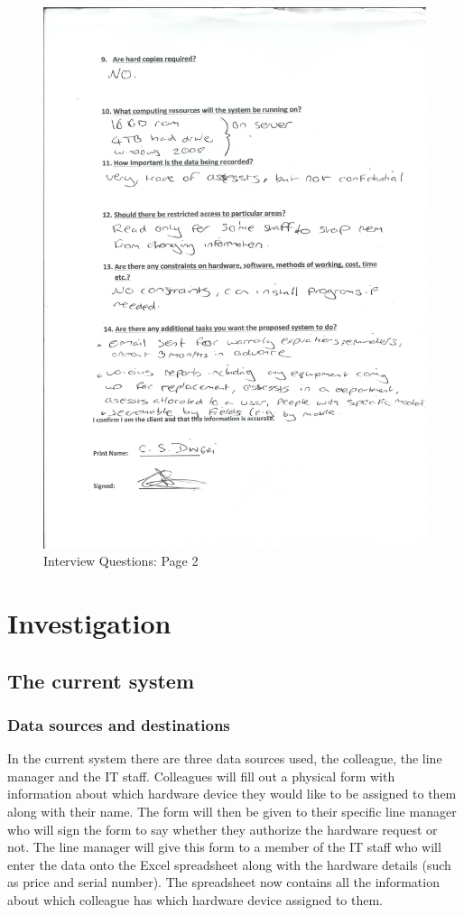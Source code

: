 \begin{figure}[H]
\includegraphics[width=.9\textwidth,height=.9\textheight,keepaspectratio]{Page2Interview.jpg}
\caption{Interview Questions: Page 2} \label{Page1Interview}
\end{figure}

\section{Investigation}

\subsection{The current system}

\subsubsection{Data sources and destinations}

In the current system there are three data sources used, the colleague, the line manager and the IT staff. Colleagues will fill out a physical form with information about which hardware device they would like to be assigned to them along with their name. The form will then be given to their specific line manager who will sign the form to say whether they authorize the hardware request or not. The line manager will give this form to a member of the IT staff who will enter the data onto the Excel spreadsheet along with the hardware details (such as price and serial number). The spreadsheet now contains all the information about which colleague has which hardware device assigned to them.

